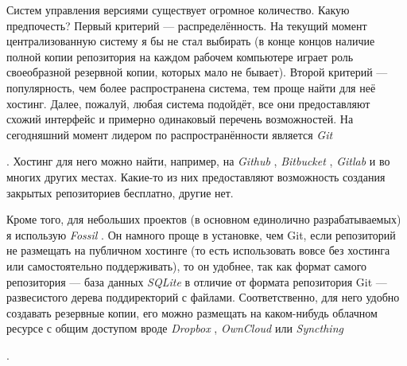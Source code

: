 \documentclass[a4paper,12pt,hyphens]{article}
\newcommand\softname[1]{\textit{#1}}
\begin{document}
Систем управления версиями существует огромное количество. Какую предпочесть?
Первый критерий --- распределённость. На текущий момент централизованную систему
я бы не стал выбирать (в конце концов наличие полной копии репозитория на каждом
рабочем компьютере играет роль своеобразной резервной копии, которых мало не
бывает). Второй критерий --- популярность, чем более распространена система, тем проще
найти для неё хостинг. Далее, пожалуй, любая система подойдёт, все они предоставляют
схожий интерфейс и примерно одинаковый перечень возможностей. На сегодняшний момент
лидером по распространённости является \softname{Git} \begin{otherlanguage}{english}\parencite{site-git}\end{otherlanguage}.
Хостинг для него можно найти, например, на \softname{Github} \parencite{site-github},
\softname{Bitbucket} \parencite{site-bitbucket}, \softname{Gitlab} \parencite{site-gitlab}
и во многих других местах. Какие-то из них предоставляют возможность создания закрытых
репозиториев бесплатно, другие нет.

Кроме того, для небольших проектов (в основном единолично разрабатываемых) я использую
\softname{Fossil} \parencite{site-fossil}. Он намного проще в установке, чем Git,
если репозиторий не размещать на публичном хостинге (то есть использовать вовсе без
хостинга или самостоятельно поддерживать), то он удобнее, так как формат самого
репозитория --- база данных \softname{SQLite} \parencite{site-sqlite} в отличие от
формата репозитория Git --- развесистого дерева поддиректорий с файлами. Соответственно,
для него удобно создавать резервные копии, его можно размещать на каком-нибудь облачном
ресурсе с общим доступом вроде \softname{Dropbox} \parencite{site-dropbox},
\softname{OwnCloud} \parencite{site-owncloud} или \softname{Syncthing}
\begin{otherlanguage}{english}\parencite{site-syncthing}\end{otherlanguage}.
\end{document}
